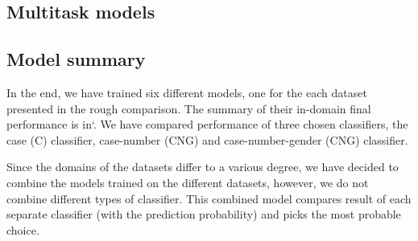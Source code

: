 \subsection{Multitask models}

\subsection{Model summary}

In the end, we have trained six different models, one for the each dataset presented in the rough comparison.
The summary of their in-domain final performance is in`. We have compared performance
of three chosen classifiers, the case (C) classifier, case-number (CNG) and case-number-gender (CNG) classifier.

Since the domains of the datasets differ to a various degree, we have decided to combine the models trained
on the different datasets, however, we do not combine different types of classifier. This combined model
compares result of each separate classifier (with the prediction probability) and picks the most probable choice.

